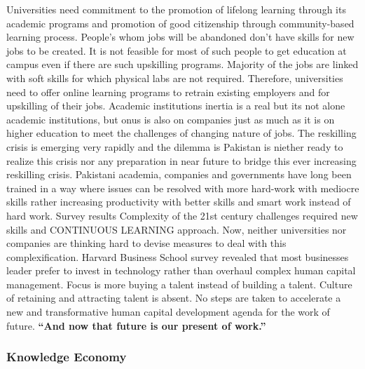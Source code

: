 \documentclass[]{elsarticle} %
\begin{document}
Universities need commitment to the promotion of lifelong learning
through its academic programs and promotion of good citizenship through
community-based learning process. People's whom jobs will be abandoned
don't have skills for new jobs to be created. It is not feasible for
most of such people to get education at campus even if there are such
upskilling programs. Majority of the jobs are linked with soft skills
for which physical labs are not required. Therefore, universities need
to offer online learning programs to retrain existing employers and for
upskilling of their jobs. Academic institutions inertia is a real but
its not alone academic institutions, but onus is also on companies just
as much as it is on higher education to meet the challenges of changing
nature of jobs. The reskilling crisis is emerging very rapidly and the
dilemma is Pakistan is niether ready to realize this crisis nor any
preparation in near future to bridge this ever increasing reskilling
crisis. Pakistani academia, companies and governments have long been
trained in a way where issues can be resolved with more hard-work with
mediocre skills rather increasing productivity with better skills and
smart work instead of hard work. Survey results Complexity of the 21st
century challenges required new skills and CONTINUOUS LEARNING approach.
Now, neither universities nor companies are thinking hard to devise
measures to deal with this complexification. Harvard Business School
survey revealed that most businesses leader prefer to invest in
technology rather than overhaul complex human capital management. Focus
is more buying a talent instead of building a talent. Culture of
retaining and attracting talent is absent. No steps are taken to
accelerate a new and transformative human capital development agenda for
the work of future. \textbf{``And now that future is our present of
work.''}

\hypertarget{knowledge-economy}{%
\subsubsection{Knowledge Economy}\label{knowledge-economy}}
\end{document}
